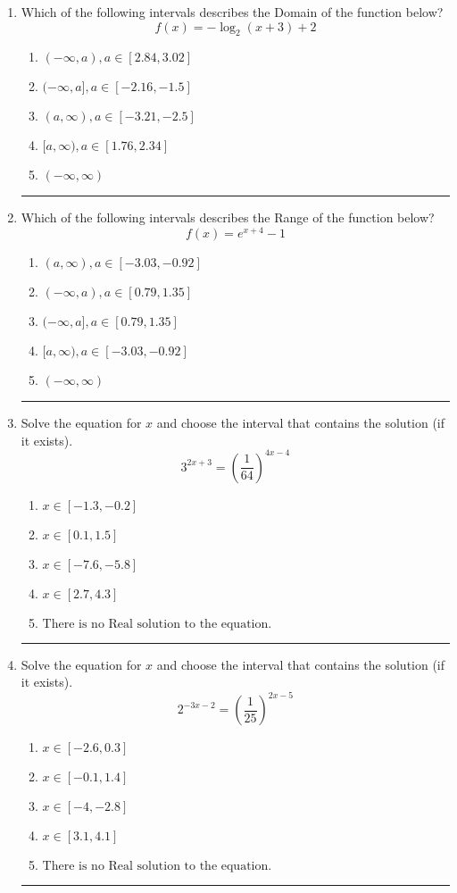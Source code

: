\documentclass[14pt]{extbook}
\newcommand{\litem}[1]{\item#1\hspace*{-1cm}\rule{\textwidth}{0.4pt}}
\begin{document}
\begin{enumerate}
{\begin{enumerate}[label=\Alph*.]
\end{enumerate} }
\litem{
Which of the following intervals describes the Domain of the function below?\[ f(x) = -\log_2{(x+3)}+2 \]\begin{enumerate}[label=\Alph*.]
\item \( (-\infty, a), a \in [2.84, 3.02] \)
\item \( (-\infty, a], a \in [-2.16, -1.5] \)
\item \( (a, \infty), a \in [-3.21, -2.5] \)
\item \( [a, \infty), a \in [1.76, 2.34] \)
\item \( (-\infty, \infty) \)

\end{enumerate} }
\litem{
Which of the following intervals describes the Range of the function below?\[ f(x) = e^{x+4}-1 \]\begin{enumerate}[label=\Alph*.]
\item \( (a, \infty), a \in [-3.03, -0.92] \)
\item \( (-\infty, a), a \in [0.79, 1.35] \)
\item \( (-\infty, a], a \in [0.79, 1.35] \)
\item \( [a, \infty), a \in [-3.03, -0.92] \)
\item \( (-\infty, \infty) \)

\end{enumerate} }
\litem{
Solve the equation for $x$ and choose the interval that contains the solution (if it exists).\[ 3^{2x+3} = \left(\frac{1}{64}\right)^{4x-4} \]\begin{enumerate}[label=\Alph*.]
\item \( x \in [-1.3, -0.2] \)
\item \( x \in [0.1, 1.5] \)
\item \( x \in [-7.6, -5.8] \)
\item \( x \in [2.7, 4.3] \)
\item \( \text{There is no Real solution to the equation.} \)

\end{enumerate} }
\litem{
Solve the equation for $x$ and choose the interval that contains the solution (if it exists).\[ 2^{-3x-2} = \left(\frac{1}{25}\right)^{2x-5} \]\begin{enumerate}[label=\Alph*.]
\item \( x \in [-2.6, 0.3] \)
\item \( x \in [-0.1, 1.4] \)
\item \( x \in [-4, -2.8] \)
\item \( x \in [3.1, 4.1] \)
\item \( \text{There is no Real solution to the equation.} \)


\end{enumerate}}
\end{enumerate}
\end{document}
